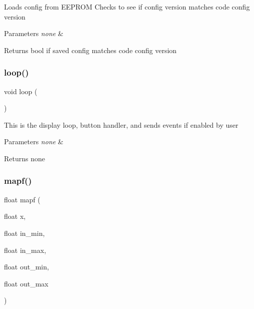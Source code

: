 Loads config from E\+E\+P\+R\+OM Checks to see if config version matches code config version


\begin{DoxyParams}{Parameters}
{\em none} & \\
\hline
\end{DoxyParams}
\begin{DoxyReturn}{Returns}
bool if saved config matches code config version 
\end{DoxyReturn}
\hypertarget{_u_s_b___tester___o_l_e_d__128x64___beta__2_82_8ino_afe461d27b9c48d5921c00d521181f12f}{}\label{_u_s_b___tester___o_l_e_d__128x64___beta__2_82_8ino_afe461d27b9c48d5921c00d521181f12f} 
\subsubsection{\texorpdfstring{loop()}{loop()}}
{\footnotesize\ttfamily void loop (\begin{DoxyParamCaption}{ }\end{DoxyParamCaption})}

This is the display loop, button handler, and sends events if enabled by user


\begin{DoxyParams}{Parameters}
{\em none} & \\
\hline
\end{DoxyParams}
\begin{DoxyReturn}{Returns}
none 
\end{DoxyReturn}
\hypertarget{_u_s_b___tester___o_l_e_d__128x64___beta__2_82_8ino_a06d59f8f94c4693a77270d804881f468}{}\label{_u_s_b___tester___o_l_e_d__128x64___beta__2_82_8ino_a06d59f8f94c4693a77270d804881f468} 
\subsubsection{\texorpdfstring{mapf()}{mapf()}}
{\footnotesize\ttfamily float mapf (\begin{DoxyParamCaption}\item[{float}]{x,  }\item[{float}]{in\+\_\+min,  }\item[{float}]{in\+\_\+max,  }\item[{float}]{out\+\_\+min,  }\item[{float}]{out\+\_\+max }\end{DoxyParamCaption})}

